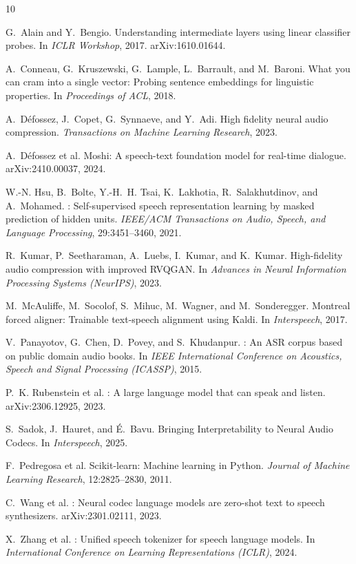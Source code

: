 \documentclass[10pt,twocolumn]{article}
\begin{document}
\begin{thebibliography}{10}

G.~Alain and Y.~Bengio.
\newblock Understanding intermediate layers using linear classifier probes.
\newblock In \emph{ICLR Workshop}, 2017.
\newblock arXiv:1610.01644.

A.~Conneau, G.~Kruszewski, G.~Lample, L.~Barrault, and M.~Baroni.
\newblock What you can cram into a single vector: Probing sentence embeddings
  for linguistic properties.
\newblock In \emph{Proceedings of ACL}, 2018.

A.~D{\'e}fossez, J.~Copet, G.~Synnaeve, and Y.~Adi.
\newblock High fidelity neural audio compression.
\newblock \emph{Transactions on Machine Learning Research}, 2023.

A.~D{\'e}fossez et al.
\newblock Moshi: A speech-text foundation model for real-time dialogue.
\newblock arXiv:2410.00037, 2024.

W.-N. Hsu, B.~Bolte, Y.-H.~H. Tsai, K.~Lakhotia, R.~Salakhutdinov, and
  A.~Mohamed.
: Self-supervised speech representation learning by masked
  prediction of hidden units.
\newblock \emph{IEEE/ACM Transactions on Audio, Speech, and Language
  Processing}, 29:3451--3460, 2021.

R.~Kumar, P.~Seetharaman, A.~Luebs, I.~Kumar, and K.~Kumar.
\newblock High-fidelity audio compression with improved {RVQGAN}.
\newblock In \emph{Advances in Neural Information Processing Systems
  (NeurIPS)}, 2023.

M.~McAuliffe, M.~Socolof, S.~Mihuc, M.~Wagner, and M.~Sonderegger.
\newblock Montreal forced aligner: Trainable text-speech alignment using
  {Kaldi}.
\newblock In \emph{Interspeech}, 2017.

V.~Panayotov, G.~Chen, D.~Povey, and S.~Khudanpur.
: An {ASR} corpus based on public domain audio books.
\newblock In \emph{IEEE International Conference on Acoustics, Speech and
  Signal Processing (ICASSP)}, 2015.

P.~K. Rubenstein et al.
: A large language model that can speak and listen.
\newblock arXiv:2306.12925, 2023.

S.~Sadok, J.~Hauret, and É.~Bavu.
\newblock Bringing Interpretability to Neural Audio Codecs.
\newblock In \emph{Interspeech}, 2025.

F.~Pedregosa et al.
\newblock Scikit-learn: Machine learning in {Python}.
\newblock \emph{Journal of Machine Learning Research}, 12:2825--2830, 2011.

C.~Wang et al.
: Neural codec language models are zero-shot text to speech
  synthesizers.
\newblock arXiv:2301.02111, 2023.

X.~Zhang et al.
: Unified speech tokenizer for speech language
  models.
\newblock In \emph{International Conference on Learning Representations
  (ICLR)}, 2024.

\end{thebibliography}
\end{document}

